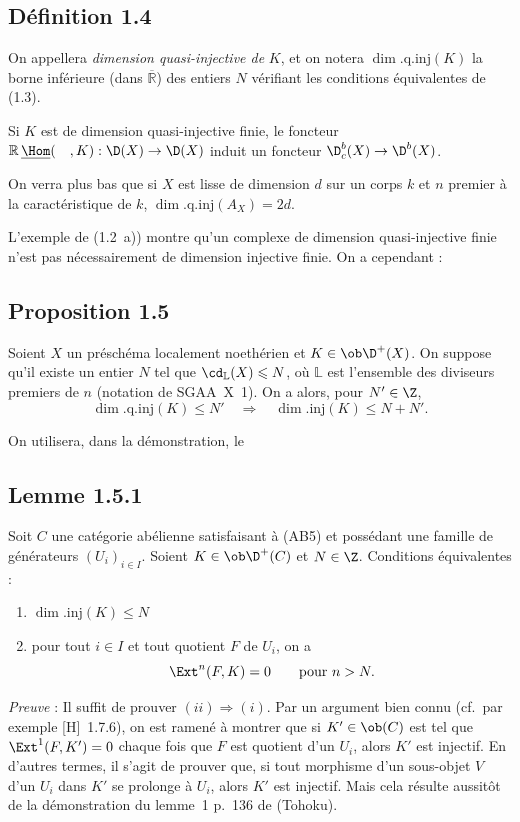 \subsection*{Définition 1.4}
On appellera \emph{dimension quasi-injective de} $K$, et on notera $\dim.\mathrm{q.inj}(K)$ la borne inférieure (dans $\overline{\mathbb{R}}$) des entiers $N$ vérifiant les conditions équivalentes de (1.3).

Si $K$ est de dimension quasi-injective finie, le foncteur $\mathbb{R}\,\underline{\Hom}(\quad,K) : \D(X) \to \D(X)$ induit un foncteur $\D_c^{b}(X) \to \D^{b}(X)$.

On verra plus bas que si $X$ est lisse de dimension $d$ sur un corps $k$ et $n$ premier à la caractéristique de $k$, $\dim.\mathrm{q.inj}(A_X) = 2d$.

L'exemple de (1.2~a)) montre qu'un complexe de dimension quasi-injective finie n'est pas nécessairement de dimension injective finie. On a cependant :

\subsection*{Proposition 1.5}
Soient $X$ un préschéma localement noethérien et $K \in \ob \D^{+}(X)$. On suppose qu'il existe un entier $N$ tel que $\cd_{\mathbb{L}}(X) \leqslant N$, où $\mathbb{L}$ est l'ensemble des diviseurs premiers de $n$ (notation de SGAA~X~1). On a alors, pour $N' \in \Z$,
\[
\dim.\mathrm{q.inj}(K) \leqslant N' \quad \Longrightarrow \quad \dim.\mathrm{inj}(K) \leqslant N + N'.
\]

On utilisera, dans la démonstration, le

\subsection*{Lemme 1.5.1}
Soit $C$ une catégorie abélienne satisfaisant à (AB5) et possédant une famille de générateurs $(U_i)_{i \in I}$. Soient $K \in \ob \D^{+}(C)$ et $N \in \Z$. Conditions équivalentes :
\begin{enumerate}[label=(\roman*)]
\item $\dim.\mathrm{inj}(K) \leqslant N$
\item pour tout $i \in I$ et tout quotient $F$ de $U_i$, on a
\[
\Ext^n(F,K) = 0 \qquad \text{pour } n > N.
\]
\end{enumerate}

\emph{Preuve} : Il suffit de prouver $(ii) \Rightarrow (i)$. Par un argument bien connu (cf.\ par exemple [H]~1.7.6), on est ramené à montrer que si $K' \in \ob(C)$ est tel que $\Ext^1(F,K') = 0$ chaque fois que $F$ est quotient d'un $U_i$, alors $K'$ est injectif. En d'autres termes, il s'agit de prouver que, si tout morphisme d'un sous-objet $V$ d'un $U_i$ dans $K'$ se prolonge à $U_i$, alors $K'$ est injectif. Mais cela résulte aussitôt de la démonstration du lemme~1 p.~136 de (Tohoku).

